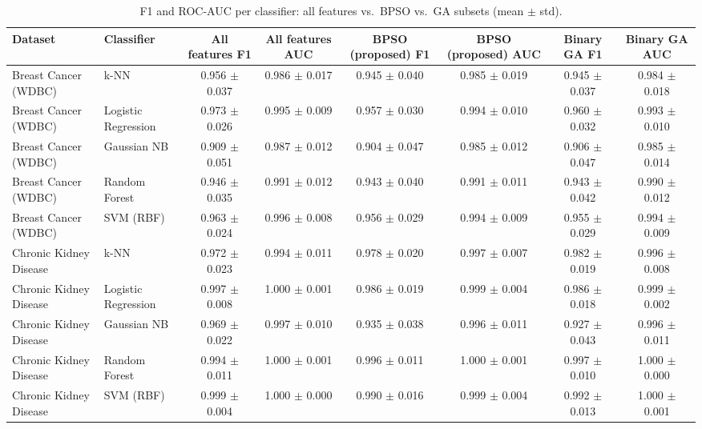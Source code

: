 \begin{table}[!t]
\centering
\caption{F1 and ROC-AUC per classifier: all features vs.\ BPSO vs.\ GA subsets (mean $\pm$ std).}
\label{tab:classifiers}
\footnotesize
\setlength{\tabcolsep}{4pt}
\begin{adjustbox}{max width=\linewidth}
\begin{tabular}{llcccccc}
\toprule
\textbf{Dataset} & \textbf{Classifier} & \textbf{All features F1} & \textbf{All features AUC} & \textbf{BPSO (proposed) F1} & \textbf{BPSO (proposed) AUC} & \textbf{Binary GA F1} & \textbf{Binary GA AUC} \\
\midrule
Breast Cancer (WDBC) & k-NN & 0.956 $\pm$ 0.037 & 0.986 $\pm$ 0.017 & 0.945 $\pm$ 0.040 & 0.985 $\pm$ 0.019 & 0.945 $\pm$ 0.037 & 0.984 $\pm$ 0.018 \\
Breast Cancer (WDBC) & Logistic Regression & 0.973 $\pm$ 0.026 & 0.995 $\pm$ 0.009 & 0.957 $\pm$ 0.030 & 0.994 $\pm$ 0.010 & 0.960 $\pm$ 0.032 & 0.993 $\pm$ 0.010 \\
Breast Cancer (WDBC) & Gaussian NB & 0.909 $\pm$ 0.051 & 0.987 $\pm$ 0.012 & 0.904 $\pm$ 0.047 & 0.985 $\pm$ 0.012 & 0.906 $\pm$ 0.047 & 0.985 $\pm$ 0.014 \\
Breast Cancer (WDBC) & Random Forest & 0.946 $\pm$ 0.035 & 0.991 $\pm$ 0.012 & 0.943 $\pm$ 0.040 & 0.991 $\pm$ 0.011 & 0.943 $\pm$ 0.042 & 0.990 $\pm$ 0.012 \\
Breast Cancer (WDBC) & SVM (RBF) & 0.963 $\pm$ 0.024 & 0.996 $\pm$ 0.008 & 0.956 $\pm$ 0.029 & 0.994 $\pm$ 0.009 & 0.955 $\pm$ 0.029 & 0.994 $\pm$ 0.009 \\
Chronic Kidney Disease & k-NN & 0.972 $\pm$ 0.023 & 0.994 $\pm$ 0.011 & 0.978 $\pm$ 0.020 & 0.997 $\pm$ 0.007 & 0.982 $\pm$ 0.019 & 0.996 $\pm$ 0.008 \\
Chronic Kidney Disease & Logistic Regression & 0.997 $\pm$ 0.008 & 1.000 $\pm$ 0.001 & 0.986 $\pm$ 0.019 & 0.999 $\pm$ 0.004 & 0.986 $\pm$ 0.018 & 0.999 $\pm$ 0.002 \\
Chronic Kidney Disease & Gaussian NB & 0.969 $\pm$ 0.022 & 0.997 $\pm$ 0.010 & 0.935 $\pm$ 0.038 & 0.996 $\pm$ 0.011 & 0.927 $\pm$ 0.043 & 0.996 $\pm$ 0.011 \\
Chronic Kidney Disease & Random Forest & 0.994 $\pm$ 0.011 & 1.000 $\pm$ 0.001 & 0.996 $\pm$ 0.011 & 1.000 $\pm$ 0.001 & 0.997 $\pm$ 0.010 & 1.000 $\pm$ 0.000 \\
Chronic Kidney Disease & SVM (RBF) & 0.999 $\pm$ 0.004 & 1.000 $\pm$ 0.000 & 0.990 $\pm$ 0.016 & 0.999 $\pm$ 0.004 & 0.992 $\pm$ 0.013 & 1.000 $\pm$ 0.001 \\

\end{tabular}
\end{adjustbox}
\end{table}
